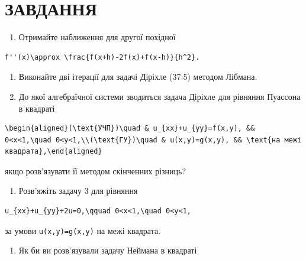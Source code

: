 \documentclass[
  ukrainian,
]{article}
\providecommand{\tightlist}{%
  \setlength{\itemsep}{0pt}\setlength{\parskip}{0pt}}
\begin{document}
\section{ЗАВДАННЯ}\label{ux437ux430ux432ux434ux430ux43dux43dux44f-8}

\begin{enumerate}
\def\labelenumi{\arabic{enumi}.}
\tightlist
\item
  Отримайте наближення для другої похідної
\end{enumerate}

\begin{verbatim}
f''(x)\approx \frac{f(x+h)-2f(x)+f(x-h)}{h^2}.
\end{verbatim}

\begin{enumerate}
\def\labelenumi{\arabic{enumi}.}
\setcounter{enumi}{1}
\item
  Виконайте дві ітерації для задачі Діріхле (37.5) методом Лібмана.
\item
  До якої алгебраїчної системи зводиться задача Діріхле для рівняння
  Пуассона в квадраті
\end{enumerate}

\begin{verbatim}
\begin{aligned}(\text{УЧП})\quad & u_{xx}+u_{yy}=f(x,y), && 0<x<1,\quad 0<y<1,\\(\text{ГУ})\quad & u(x,y)=g(x,y), && \text{на межі квадрата},\end{aligned}
\end{verbatim}

якщо розв'язувати її методом скінченних різниць?

\begin{enumerate}
\def\labelenumi{\arabic{enumi}.}
\setcounter{enumi}{3}
\tightlist
\item
  Розв'яжіть задачу 3 для рівняння
\end{enumerate}

\begin{verbatim}
u_{xx}+u_{yy}+2u=0,\qquad 0<x<1,\quad 0<y<1,
\end{verbatim}

за умови \texttt{u(x,y)=g(x,y)} на межі квадрата.

\begin{enumerate}
\def\labelenumi{\arabic{enumi}.}
\setcounter{enumi}{4}
\tightlist
\item
  Як би ви розв'язували задачу Неймана в квадраті
\end{enumerate}
\end{document}

